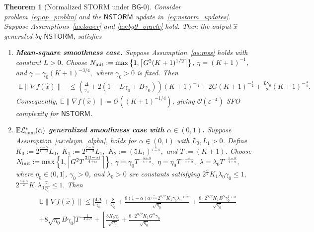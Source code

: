 \documentclass[letter,11pt]{article}
\newtheorem{theorem}{Theorem}[]
\newcommand{\E}{\mathbb{E}}
\newcommand{\Ocal}{\mathcal{O}}
\newcommand{\Lcal}{\mathcal{L}}
\begin{document}
\begin{theorem}[Normalized STORM under $\mathsf{BG}$-0]
\label{thm:nstorm_three_regimes}
Consider problem~\eqref{eq:op_problm} and the $\mathsf{NSTORM}$ update in~\eqref{eq:nstorm_updates}. Suppose Assumptions~\ref{as:lower} and \ref{as:bg0_oracle} hold. Then the output $\widehat{x}$ generated by $\mathsf{NSTORM}$, satisfies
\begin{enumerate}[label=(\roman*), leftmargin=*]
\item \textbf{Mean-square smoothness case.} 
Suppose Assumption~\ref{as:mss} holds with constant $L>0$. Choose $N_{\rm init} := \max\left\{ 1,\left\lceil G^2 (K+1)^{1/2}\right\rceil \right\}$, $\eta=(K+1)^{-1}$, and $\gamma=\gamma_0(K+1)^{-3/4},$ where $\gamma_0>0$ is fixed. Then
\[
\begin{aligned}
\E\|\nabla f(\widehat x)\| & \le
\left( \frac{\Delta}{\gamma_0} +2(1 + L\gamma_0 + B\gamma_0)
\right)(K+1)^{-\tfrac{1}{4} }+ 2G(K+1)^{-\tfrac{1}{2} } + \frac{L\gamma_0}{2}(K+1)^{-\tfrac{3}{4} }.
\end{aligned}
\]
Consequently, $\E\|\nabla f(\widehat x)\| = \Ocal((K+1)^{-1/4})$, giving $\Ocal(\varepsilon^{-4})$ SFO complexity for $\mathsf{NSTORM}$.
\item \textbf{$\E\Lcal^*_{\rm sym}(\alpha)$ generalized smoothness case with $\alpha \in (0,1)$.} 
Suppose Assumption~\ref{as:elsym_alpha}, holds for $\alpha \in (0,1)$ with $L_0, L_1 >0$. Define $K_0:=2^{\frac{2-\alpha}{1-\alpha}}L_0,$ $K_1:=2^{\frac{2-\alpha}{1-\alpha}}L_1,$ $K_2:=(5L_1)^{\frac{1}{1-\alpha}},$ and $T:=(K+1)$. Choose $N_{\rm init} := \max\left\{ 1,\left\lceil G^2T^{\frac{2(1-\alpha)}{4+\alpha}}\right\rceil \right\}$, $\gamma=\gamma_0T^{-\frac{3+\alpha}{4+\alpha}},$ $\eta=\eta_0T^{-\frac{4}{4+\alpha}},$ $\lambda=\lambda_0T^{-\frac{1-\alpha}{4+\alpha}},$ where $\eta_0\in(0,1]$, $\gamma_0>0$, and $\lambda_0>0$ are constants satisfying $2^{\tfrac{\alpha}{2}}K_1\lambda_0\gamma_0\le1, $ $2^{\tfrac{6+\alpha}{2}}K_1\lambda_0\frac{\gamma_0}{\eta_0}\le 1.$ Then 
\[
\begin{aligned}
&\E\|\nabla f(\widehat x)\|
\le \Bigg[ \frac{4\Delta}{\gamma_0} + \frac{8}{\eta_0} +
    \frac{8(1-\alpha)\alpha^{\frac{\alpha}{1-\alpha}}2^{\alpha/2}K_1\gamma_0\lambda_0^{-\frac{\alpha}{1-\alpha}}}{\sqrt{\eta_0}}
    +
    \frac{
        8\cdot 2^{\alpha/2}K_1B^\alpha\gamma_0^{1+\alpha}
    }{\sqrt{\eta_0}}
\\
&
    +
    8\sqrt{\eta_0}B\gamma_0
\Bigg]T^{-\frac{1}{4+\alpha}} +
\left[
    \frac{8K_0\gamma_0}{\sqrt{\eta_0}}
    +
    \frac{8\cdot 2^{\alpha/2}K_1G^\alpha\gamma_0}{\sqrt{\eta_0}}

\end{aligned}\]
\end{enumerate}
\end{theorem}
\end{document}
